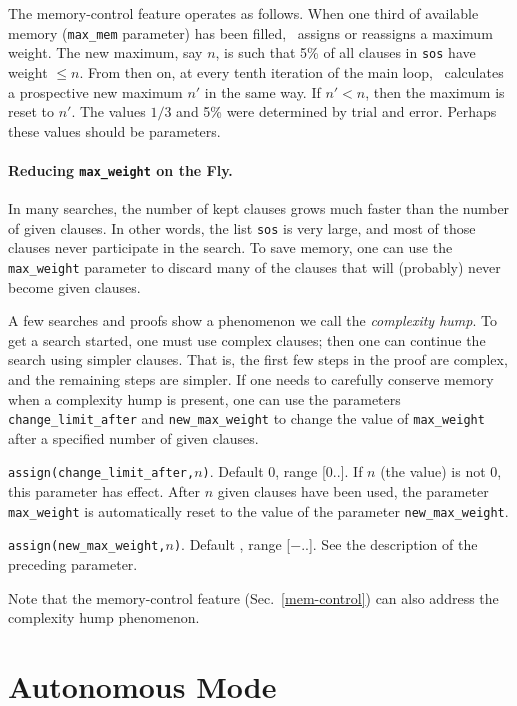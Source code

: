 \documentclass[11pt]{article}
\begin{document}
The memory-control feature operates as follows.  When one third of
available memory (\verb:max_mem: parameter) has been filled, \otter\
assigns or reassigns a maximum weight.  The new maximum, say $n$,
is such that 5\% of all clauses in \verb:sos: have weight $\leq n$.
From then on, at every tenth iteration of the main loop,
\otter\ calculates a prospective new maximum $n'$ in the same way.  If
$n' < n$, then the maximum is reset to $n'$.  The values
$1/3$ and 5\% were determined by trial and error.  Perhaps these values should be 
parameters.

\paragraph{Reducing {\tt max\_weight} on the Fly.}
In many searches, the number of kept clauses grows much faster than
the number of given clauses.  In other words, the list \verb:sos: is
very large, and most of those clauses never participate in the search.
To save memory, one can use the \verb:max_weight: parameter to discard
many of the clauses that will (probably) never become given clauses.

A few searches and proofs show a phenomenon we call the {\it
complexity hump}.  To get a search started, one must use complex
clauses; then one can continue the search using simpler clauses.  That
is, the first few steps in the proof are complex, and the remaining
steps are simpler.  If one needs to carefully conserve memory when a
complexity hump is present, one can use the parameters
\verb:change_limit_after: and \verb:new_max_weight: to change the
value of \verb:max_weight: after a specified number of given clauses.

\noindent
\verb:assign(change_limit_after,:$n$\verb:):.  Default 0, range [0..\maxint ].
If $n$ (the value) is not 0, this parameter has effect.
After $n$ given clauses have been used, the parameter \verb:max_weight:
is automatically reset to the value of the parameter \verb:new_max_weight:.

\noindent
\verb:assign(new_max_weight,:$n$\verb:):.  Default \maxint , range [$-$\maxint ..\maxint ].
See the description of the preceding parameter.

Note that the memory-control feature (Sec.~\ref{mem-control}) can also
address the complexity hump phenomenon.

\section{Autonomous Mode} \label{auto}
\end{document}
